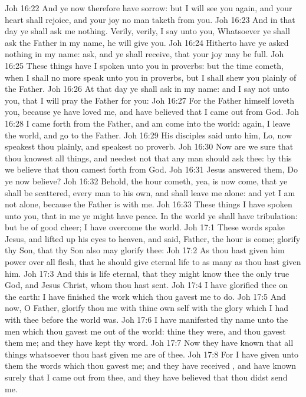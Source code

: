 \vs Joh 16:22 And ye now therefore have sorrow: but I will see you again, and your heart shall rejoice, and your joy no man taketh from you.
\vs Joh 16:23 And in that day ye shall ask me nothing. Verily, verily, I say unto you, Whatsoever ye shall ask the Father in my name, he will give  you.
\vs Joh 16:24 Hitherto have ye asked nothing in my name: ask, and ye shall receive, that your joy may be full.
\vs Joh 16:25 These things have I spoken unto you in proverbs: but the time cometh, when I shall no more speak unto you in proverbs, but I shall shew you plainly of the Father.
\vs Joh 16:26 At that day ye shall ask in my name: and I say not unto you, that I will pray the Father for you:
\vs Joh 16:27 For the Father himself loveth you, because ye have loved me, and have believed that I came out from God.
\vs Joh 16:28 I came forth from the Father, and am come into the world: again, I leave the world, and go to the Father.
\vs Joh 16:29 His disciples said unto him, Lo, now speakest thou plainly, and speakest no proverb.
\vs Joh 16:30 Now are we sure that thou knowest all things, and needest not that any man should ask thee: by this we believe that thou camest forth from God.
\vs Joh 16:31 Jesus answered them, Do ye now believe?
\vs Joh 16:32 Behold, the hour cometh, yea, is now come, that ye shall be scattered, every man to his own, and shall leave me alone: and yet I am not alone, because the Father is with me.
\vs Joh 16:33 These things I have spoken unto you, that in me ye might have peace. In the world ye shall have tribulation: but be of good cheer; I have overcome the world.
\vs Joh 17:1 These words spake Jesus, and lifted up his eyes to heaven, and said, Father, the hour is come; glorify thy Son, that thy Son also may glorify thee:
\vs Joh 17:2 As thou hast given him power over all flesh, that he should give eternal life to as many as thou hast given him.
\vs Joh 17:3 And this is life eternal, that they might know thee the only true God, and Jesus Christ, whom thou hast sent.
\vs Joh 17:4 I have glorified thee on the earth: I have finished the work which thou gavest me to do.
\vs Joh 17:5 And now, O Father, glorify thou me with thine own self with the glory which I had with thee before the world was.
\vs Joh 17:6 I have manifested thy name unto the men which thou gavest me out of the world: thine they were, and thou gavest them me; and they have kept thy word.
\vs Joh 17:7 Now they have known that all things whatsoever thou hast given me are of thee.
\vs Joh 17:8 For I have given unto them the words which thou gavest me; and they have received , and have known surely that I came out from thee, and they have believed that thou didst send me.
